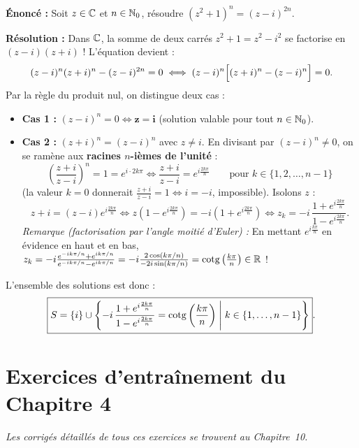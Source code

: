 \begin{exemple}
\textbf{Énoncé :} Soit $z \in \mathbb{C}$ et $n \in \mathbb{N}_0$, résoudre $(z^2 + 1)^n = (z - i)^{2n}$.

\textbf{Résolution :} Dans $\mathbb{C}$, la somme de deux carrés $z^2 + 1 = z^2 - i^2$ se factorise en $(z - i)(z + i)$ ! L'équation devient :
\[
    (z - i)^n (z + i)^n - (z - i)^{2n} = 0 \iff (z - i)^n \Bigl[(z + i)^n - (z - i)^n\Bigr] = 0.
\]
Par la règle du produit nul, on distingue deux cas :
\begin{itemize}
    \item \textbf{Cas 1 :} $(z - i)^n = 0 \iff \mathbf{z = i}$ (solution valable pour tout $n \in \mathbb{N}_0$).
    \item \textbf{Cas 2 :} $(z + i)^n = (z - i)^n$ avec $z \neq i$. En divisant par $(z - i)^n \neq 0$, on se ramène aux \textbf{racines $n$-ièmes de l'unité} :
    \[
        \left(\frac{z + i}{z - i}\right)^n = 1 = e^{i \cdot 2k\pi} \iff \frac{z + i}{z - i} = e^{i\frac{2k\pi}{n}} \qquad \text{pour } k \in \{1, 2, \dots, n - 1\}
    \]
    (la valeur $k = 0$ donnerait $\frac{z+i}{z-i} = 1 \iff i = -i$, impossible). Isolons $z$ :
    \[
        z + i = (z - i)e^{i\frac{2k\pi}{n}} \iff z\left(1 - e^{i\frac{2k\pi}{n}}\right) = -i\left(1 + e^{i\frac{2k\pi}{n}}\right) \iff z_k = -i\,\frac{1 + e^{i\frac{2k\pi}{n}}}{1 - e^{i\frac{2k\pi}{n}}}.
    \]
    \emph{Remarque (factorisation par l'angle moitié d'Euler) :} En mettant $e^{i\frac{k\pi}{n}}$ en évidence en haut et en bas, $z_k = -i\frac{e^{-ik\pi/n} + e^{ik\pi/n}}{e^{-ik\pi/n} - e^{ik\pi/n}} = -i\frac{2\cos(k\pi/n)}{-2i\sin(k\pi/n)} = \operatorname{cotg}\left(\frac{k\pi}{n}\right) \in \mathbb{R}$ !
\end{itemize}
L'ensemble des solutions est donc :
\[
    \boxed{S = \{i\} \cup \left\{-i\,\frac{1 + e^{i\frac{2k\pi}{n}}}{1 - e^{i\frac{2k\pi}{n}}} = \operatorname{cotg}\left(\frac{k\pi}{n}\right) \;\middle|\; k \in \{1, \dots, n-1\}\right\}}.
\]
\end{exemple}

\section{Exercices d'entraînement du Chapitre 4}

\emph{Les corrigés détaillés de tous ces exercices se trouvent au Chapitre~10.}

